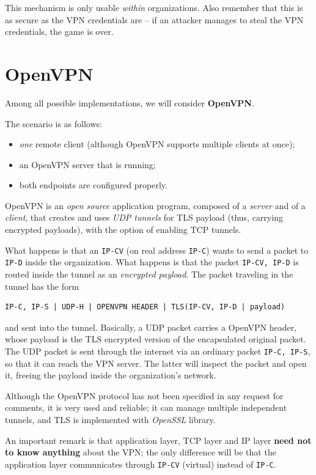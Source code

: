 \documentclass[10pt]{extbook}
\begin{document}
This mechanism is only usable \emph{within} organizations. Also remember that
this is as secure as the VPN credentials are -- if an attacker manages to steal
the VPN credentials, the game is over.

\section{OpenVPN}

Among all possible implementations, we will consider \textbf{OpenVPN}. 

The scenario is as follows:
\begin{itemize}
    \item \emph{one} remote client (although OpenVPN supports multiple clients
        at once);
    \item an OpenVPN server that is running;
    \item both endpoints are configured properly.
\end{itemize}

OpenVPN is an \emph{open source} application program, composed of a
\emph{server} and of a \emph{client}, that creates and uses \emph{UDP tunnels}
for TLS payload (thus, carrying encrypted payloads), with the option of
enabling TCP tunnels.

What happens is that an \texttt{IP-CV} (on real address \texttt{IP-C}) wants to
send a packet to \texttt{IP-D} inside the organization. What happens is that
the packet \texttt{IP-CV, IP-D} is routed inside the tunnel as an
\emph{encrypted payload}. The packet traveling in the tunnel has the form

\begin{verbatim}
IP-C, IP-S | UDP-H | OPENVPN HEADER | TLS(IP-CV, IP-D | payload)
\end{verbatim}

and sent into the tunnel. Basically, a UDP packet carries a OpenVPN header,
whose payload is the TLS encrypted version of the encapsulated original packet.
The UDP packet is sent through the internet via an ordinary packet
\texttt{IP-C, IP-S}, so that it can reach the VPN server. The latter will
inspect the packet and open it, freeing the payload inside the organization's
network.

Although the OpenVPN protocol has not been specified in any request for
comments, it is very used and reliable; it can manage multiple independent
tunnels, and TLS is implemented with \emph{OpenSSL} library.

An important remark is that application layer, TCP layer and IP layer
\textbf{need not to know anything} about the VPN; the only difference will be
that the application layer communicates through \texttt{IP-CV} (virtual)
instead of \texttt{IP-C}.
\end{document}

